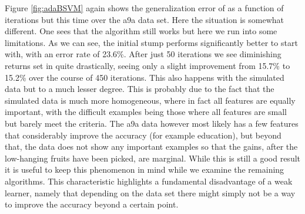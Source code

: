 \newpage
\par Figure \ref{fig:adaBSVM} again shows the generalization error of \adaB as a function of iterations but this time over the a9a data set. Here the situation is somewhat different. One sees that the algorithm still works but here we run into some limitations. As we can see, the initial stump performs significantly better to start with, with an error rate of 23.6\%. After just 50 iterations we see diminishing returns set in quite drastically, seeing only a slight improvement from 15.7\% to 15.2\% over the course of 450 iterations. This also happens with the simulated data but to a much lesser degree. This is probably due to the fact that the simulated data is much more homogeneous, where in fact all features are equally important, with the difficult examples being those where all features are small but barely meet the criteria. The a9a data however most likely has a few features that considerably improve the accuracy (for example education), but beyond that, the data does not show any important examples so that the gains, after the low-hanging fruits have been picked, are marginal. While this is still a good result it is useful to keep this phenomenon in mind while we examine the remaining algorithms. This characteristic highlights a fundamental disadvantage of a weak learner, namely that depending on the data set there might simply not be a way to improve the accuracy beyond a certain point. 

